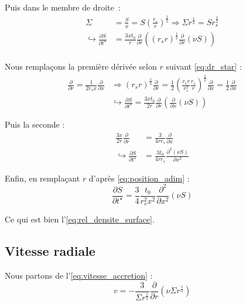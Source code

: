 Puis dans le membre de droite :
\begin{align}
    \Sigma &= \frac{S}{x} = S \left( \frac{r_s}{r} \right)^\frac{1}{2} \Rightarrow \Sigma r^\frac{1}{2} = S r_s^\frac{1}{2} \\
    \hookrightarrow \frac{\partial S}{\partial t^\star} &= \frac{3 x t_0}{r} \frac{\partial}{\partial r} \left( (r_s r)^\frac{1}{2} \frac{\partial}{\partial r} \left( \nu S \right) \right) \\
\end{align}

Nous remplaçons la première dérivée selon $r$ suivant \eqref{eq:dr_star} :
\begin{align}
    \frac{\partial}{\partial r} = \frac{1}{2 r_s x} \frac{\partial}{\partial x}
    &\Rightarrow (r_s r)^\frac{1}{2} \frac{\partial}{\partial r} = \frac{1}{2} \left( \frac{r_s r}{r_s^2} \frac{r_s}{r} \right)^\frac{1}{2} \frac{\partial}{\partial x}
                                                                = \frac{1}{2} \frac{\partial}{\partial x} \\
    &\hookrightarrow \frac{\partial S}{\partial t^\star} = \frac{3 x t_0}{2 r} \frac{\partial}{\partial r} \left( \frac{\partial}{\partial x} \left( \nu S \right) \right)
\end{align}

Puis la seconde :
\begin{align}
    \frac{3 x}{2 r} \frac{\partial}{\partial r} &= \frac{3}{4 r r_s} \frac{\partial}{\partial x} \\
    \hookrightarrow \frac{\partial S}{\partial t^\star} &= \frac{3 t_0}{4 r r_s} \frac{\partial^2 (\nu S)}{\partial x^2}
\end{align}

Enfin, en remplaçant $r$ d’après \eqref{eq:position_adim} :
\begin{equation}
    \frac{\partial S}{\partial t^\star} = \frac{3}{4} \frac{t_0}{r_s^2 x^2} \frac{\partial^2}{\partial x^2} \left(\nu S\right)
\end{equation}

Ce qui est bien l’\cref{eq:rel_densite_surface}.

\subsection{Vitesse radiale}

Nous partons de l’\cref{eq:vitesse_accretion} :
\begin{equation}
    v = - \frac{3}{\Sigma r^\frac{1}{2}} \frac{\partial}{\partial r} \left(\nu \Sigma r^\frac{1}{2} \right)
\end{equation}

